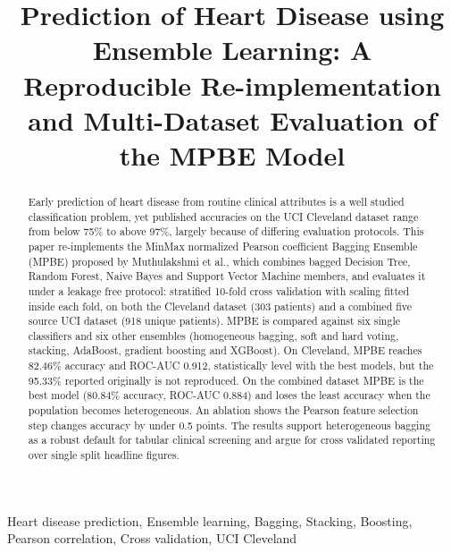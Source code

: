\documentclass[conference,a4paper,10pt]{IEEEtran}
\begin{document}
\title{Prediction of Heart Disease using Ensemble Learning: A Reproducible Re-implementation and Multi-Dataset Evaluation of the MPBE Model}
\author{
}
\maketitle
\begin{abstract}
Early prediction of heart disease from routine clinical attributes is a well studied classification problem, yet published accuracies on the UCI Cleveland dataset range from below 75\% to above 97\%, largely because of differing evaluation protocols. This paper re-implements the MinMax normalized Pearson coefficient Bagging Ensemble (MPBE) proposed by Muthulakshmi et al., which combines bagged Decision Tree, Random Forest, Naive Bayes and Support Vector Machine members, and evaluates it under a leakage free protocol: stratified 10-fold cross validation with scaling fitted inside each fold, on both the Cleveland dataset (303 patients) and a combined five source UCI dataset (918 unique patients). MPBE is compared against six single classifiers and six other ensembles (homogeneous bagging, soft and hard voting, stacking, AdaBoost, gradient boosting and XGBoost). On Cleveland, MPBE reaches 82.46\% accuracy and ROC-AUC 0.912, statistically level with the best models, but the 95.33\% reported originally is not reproduced. On the combined dataset MPBE is the best model (80.84\% accuracy, ROC-AUC 0.884) and loses the least accuracy when the population becomes heterogeneous. An ablation shows the Pearson feature selection step changes accuracy by under 0.5 points. The results support heterogeneous bagging as a robust default for tabular clinical screening and argue for cross validated reporting over single split headline figures.
\end{abstract}
\begin{IEEEkeywords}
Heart disease prediction, Ensemble learning, Bagging, Stacking, Boosting, Pearson correlation, Cross validation, UCI Cleveland
\end{IEEEkeywords}
\end{document}
